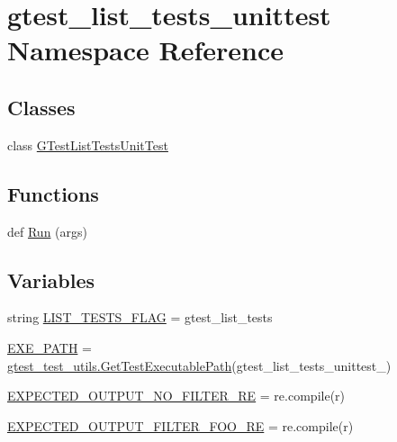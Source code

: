 \hypertarget{namespacegtest__list__tests__unittest}{}\section{gtest\+\_\+list\+\_\+tests\+\_\+unittest Namespace Reference}
\label{namespacegtest__list__tests__unittest}
\subsection*{Classes}
\begin{DoxyCompactItemize}
\item 
class \hyperlink{classgtest__list__tests__unittest_1_1GTestListTestsUnitTest}{G\+Test\+List\+Tests\+Unit\+Test}
\end{DoxyCompactItemize}
\subsection*{Functions}
\begin{DoxyCompactItemize}
\item 
def \hyperlink{namespacegtest__list__tests__unittest_ae820a362ba09ad61331e3f0c2a9f9cb6}{Run} (args)
\end{DoxyCompactItemize}
\subsection*{Variables}
\begin{DoxyCompactItemize}
\item 
string \hyperlink{namespacegtest__list__tests__unittest_a658d9ea18c57a13a25d0cce73d314e7a}{L\+I\+S\+T\+\_\+\+T\+E\+S\+T\+S\+\_\+\+F\+L\+AG} = \textquotesingle{}gtest\+\_\+list\+\_\+tests\textquotesingle{}
\item 
\hyperlink{namespacegtest__list__tests__unittest_ae58203009c92b993b4d1cabae4d5eb19}{E\+X\+E\+\_\+\+P\+A\+TH} = \hyperlink{namespacegtest__test__utils_a89ed3717984a80ffbb7a9c92f71b86a2}{gtest\+\_\+test\+\_\+utils.\+Get\+Test\+Executable\+Path}(\textquotesingle{}gtest\+\_\+list\+\_\+tests\+\_\+unittest\+\_\+\textquotesingle{})
\item 
\hyperlink{namespacegtest__list__tests__unittest_a29efbf77d2682ce359327e2e7dbd1c46}{E\+X\+P\+E\+C\+T\+E\+D\+\_\+\+O\+U\+T\+P\+U\+T\+\_\+\+N\+O\+\_\+\+F\+I\+L\+T\+E\+R\+\_\+\+RE} = re.\+compile(r)
\item 
\hyperlink{namespacegtest__list__tests__unittest_a1a20fef56cfe698649d63bc0c2b40229}{E\+X\+P\+E\+C\+T\+E\+D\+\_\+\+O\+U\+T\+P\+U\+T\+\_\+\+F\+I\+L\+T\+E\+R\+\_\+\+F\+O\+O\+\_\+\+RE} = re.\+compile(r)
\end{DoxyCompactItemize}


